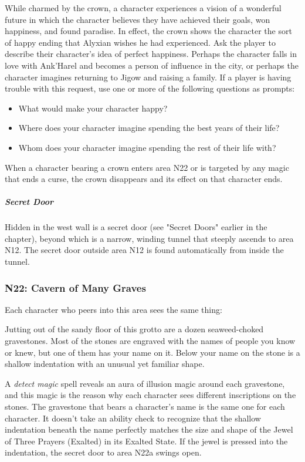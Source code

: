 \documentclass[10pt,a4paper,twoside,bg=print,twocolumn,openany,nodeprecatedcode]{dndbook}
\begin{document}
While charmed by the crown, a character experiences a vision of a wonderful future in which the character believes they have achieved their goals, won happiness, and found paradise. In effect, the crown shows the character the sort of happy ending that Alyxian wishes he had experienced. Ask the player to describe their character's idea of perfect happiness. Perhaps the character falls in love with Ank'Harel and becomes a person of influence in the city, or perhaps the character imagines returning to Jigow and raising a family. If a player is having trouble with this request, use one or more of the following questions as prompts:


\begin{itemize}
\item What would make your character happy?
\item Where does your character imagine spending the best years of their life?
\item Whom does your character imagine spending the rest of their life with?
\end{itemize}

When a character bearing a crown enters area N22 or is targeted by any magic that ends a curse, the crown disappears and its effect on that character ends.

\subparagraph{Secret Door}
Hidden in the west wall is a secret door (see "Secret Doors" earlier in the chapter), beyond which is a narrow, winding tunnel that steeply ascends to area N12. The secret door outside area N12 is found automatically from inside the tunnel.

\subsubsection{N22: Cavern of Many Graves}
Each character who peers into this area sees the same thing:

\begin{DndReadAloud}{}
Jutting out of the sandy floor of this grotto are a dozen seaweed-choked gravestones. Most of the stones are engraved with the names of people you know or knew, but one of them has your name on it. Below your name on the stone is a shallow indentation with an unusual yet familiar shape.

\end{DndReadAloud}

A \textit{detect magic} spell reveals an aura of illusion magic around each gravestone, and this magic is the reason why each character sees different inscriptions on the stones. The gravestone that bears a character's name is the same one for each character. It doesn't take an ability check to recognize that the shallow indentation beneath the name perfectly matches the size and shape of the Jewel of Three Prayers (Exalted) in its Exalted State. If the jewel is pressed into the indentation, the secret door to area N22a swings open.
\end{document}
